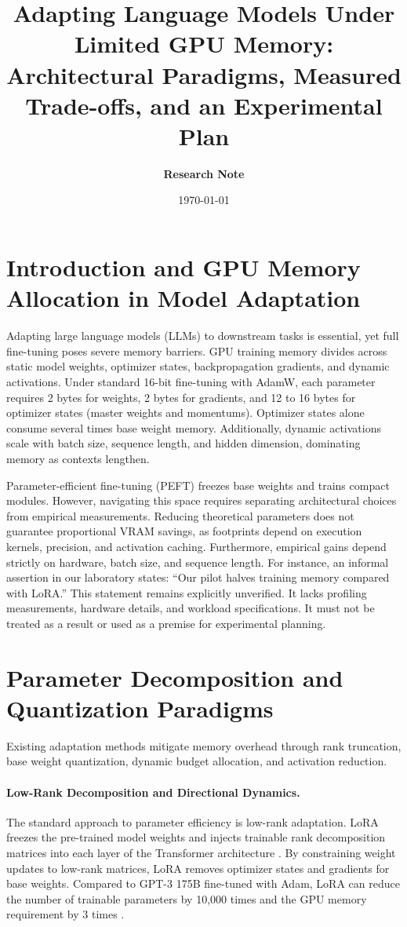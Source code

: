 \documentclass[11pt,a4paper]{article}
\title{\textbf{Adapting Language Models Under Limited GPU Memory:\\Architectural Paradigms, Measured Trade-offs, and an Experimental Plan}}
\author{\textbf{Research Note}}
\date{\today}
\begin{document}
\maketitle

\section{Introduction and GPU Memory Allocation in Model Adaptation}

Adapting large language models (LLMs) to downstream tasks is essential, yet full fine-tuning poses severe memory barriers. GPU training memory divides across static model weights, optimizer states, backpropagation gradients, and dynamic activations. Under standard 16-bit fine-tuning with AdamW, each parameter requires 2 bytes for weights, 2 bytes for gradients, and 12 to 16 bytes for optimizer states (master weights and momentums). Optimizer states alone consume several times base weight memory. Additionally, dynamic activations scale with batch size, sequence length, and hidden dimension, dominating memory as contexts lengthen.

Parameter-efficient fine-tuning (PEFT) freezes base weights and trains compact modules. However, navigating this space requires separating architectural choices from empirical measurements. Reducing theoretical parameters does not guarantee proportional VRAM savings, as footprints depend on execution kernels, precision, and activation caching. Furthermore, empirical gains depend strictly on hardware, batch size, and sequence length. For instance, an informal assertion in our laboratory states: ``Our pilot halves training memory compared with LoRA.'' This statement remains explicitly unverified. It lacks profiling measurements, hardware details, and workload specifications. It must not be treated as a result or used as a premise for experimental planning.

\section{Parameter Decomposition and Quantization Paradigms}

Existing adaptation methods mitigate memory overhead through rank truncation, base weight quantization, dynamic budget allocation, and activation reduction.

\paragraph{Low-Rank Decomposition and Directional Dynamics.}
The standard approach to parameter efficiency is low-rank adaptation. LoRA freezes the pre-trained model weights and injects trainable rank decomposition matrices into each layer of the Transformer architecture \cite{hu2021lora}. By constraining weight updates to low-rank matrices, LoRA removes optimizer states and gradients for base weights. Compared to GPT-3 175B fine-tuned with Adam, LoRA can reduce the number of trainable parameters by 10,000 times and the GPU memory requirement by 3 times \cite{hu2021lora}. 
\end{document}
